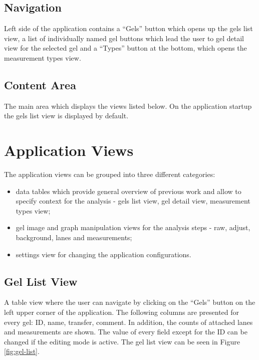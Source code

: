 \subsection{Navigation}
Left side of the application contains a “Gels” button which opens up the gels list view, a list of individually named gel buttons which lead the user to gel detail view for the selected gel and a “Types” button at the bottom, which opens the measurement types view.

\subsection{Content Area}
The main area which displays the views listed below. On the application startup the gels list view is displayed by default.

\section{Application Views}

The application views can be grouped into three different categories:
\begin{itemize}
    \item data tables which provide general overview of previous work and allow to specify context for the analysis - gels list view, gel detail view, measurement types view;
    \item gel image and graph manipulation views for the analysis steps - raw, adjust, background, lanes and measurements;
    \item settings view for changing the application configurations.
\end{itemize}

\subsection{Gel List View}
A table view where the user can navigate by clicking on the “Gels” button on the left upper corner of the application. The following columns are presented for every gel: ID, name, transfer, comment. In addition, the counts of attached lanes and measurements are shown. The value of every field except for the ID can be changed if the editing mode is active. The gel list view can be seen in Figure \ref{fig:gel-list}.

